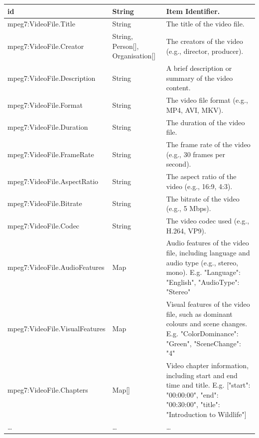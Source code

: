 \begin{longtable}{|p{}|p{}|p{}|}
    \scriptsize id                                    & \scriptsize String                         & \scriptsize Item Identifier. \\
    \hline
    \scriptsize mpeg7:VideoFile.Title                 & \scriptsize String                         & \scriptsize The title of the video file. \\
    \hline
    \scriptsize mpeg7:VideoFile.Creator               & \scriptsize String, \textcolor{uniudColor3}{Person}[], \textcolor{uniudColor3}{Organisation}[]        & \scriptsize The creators of the video (e.g., director, producer). \\
    \hline
    \scriptsize mpeg7:VideoFile.Description           & \scriptsize String                         & \scriptsize A brief description or summary of the video content. \\
    \hline
    \scriptsize mpeg7:VideoFile.Format                & \scriptsize String                         & \scriptsize The video file format (e.g., MP4, AVI, MKV). \\
    \hline
    \scriptsize mpeg7:VideoFile.Duration              & \scriptsize String                         & \scriptsize The duration of the video file. \\
    \hline
    \scriptsize mpeg7:VideoFile.FrameRate             & \scriptsize String                         & \scriptsize The frame rate of the video (e.g., 30 frames per second). \\
    \hline
    \scriptsize mpeg7:VideoFile.AspectRatio           & \scriptsize String                         & \scriptsize The aspect ratio of the video (e.g., 16:9, 4:3). \\
    \hline
    \scriptsize mpeg7:VideoFile.Bitrate               & \scriptsize String                         & \scriptsize The bitrate of the video (e.g., 5 Mbps). \\
    \hline
    \scriptsize mpeg7:VideoFile.Codec                 & \scriptsize String                         & \scriptsize The video codec used (e.g., H.264, VP9). \\
    \hline
    \scriptsize mpeg7:VideoFile.AudioFeatures         & \scriptsize Map                            & \scriptsize Audio features of the video file, including language and audio type (e.g., stereo, mono). E.g. {"Language": "English", "AudioType": "Stereo"} \\
    \hline
    \scriptsize mpeg7:VideoFile.VisualFeatures        & \scriptsize Map                            & \scriptsize Visual features of the video file, such as dominant colours and scene changes. E.g. {"ColorDominance": "Green", "SceneChange": "4"} \\
    \hline
    \scriptsize mpeg7:VideoFile.Chapters              & \scriptsize Map[]                          & \scriptsize Video chapter information, including start and end time and title. E.g. [{"start": "00:00:00", "end": "00:30:00", "title": "Introduction to Wildlife"}] \\
    \hline
    …                                     & \scriptsize …                              & … \\
    \hline


\end{longtable}
